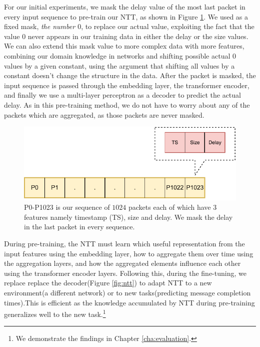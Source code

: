 For our initial experiments, we mask the delay value of the most last packet in every input sequence to pre-train our NTT, as shown in Figure \ref{fig:mask}. We used as a fixed mask, \emph{the number $0$}, to replace our actual value, exploiting the fact that the value $0$ never appears in our training data in either the delay or the size values. We can also extend this mask value to more complex data with more features, combining our domain knowledge in networks and shifting possible actual $0$ values by a given constant, using the argument that shifting all values by a constant doesn't change the structure in the data. After the packet is masked, the input sequence is passed through the embedding layer, the transformer encoder, and finally we use a multi-layer perceptron as a decoder to predict the actual delay. As in this pre-training method, we do not have to worry about any of the packets which are aggregated, as those packets are never masked.

\begin{figure}[h]
  \begin{center}
    \includegraphics[scale=1]{figures/mask.pdf}
    \caption{P0-P1023  is our sequence of $1024$ packets each of which have 3 features namely timestamp (TS), size and delay. We mask the delay in the last packet in every sequence. }
    \label{fig:mask}
  \end{center}
\end{figure}

During pre-training, the NTT must learn which useful representation from the input features using the embedding layer, how to aggregate them over time using the aggregation layers, and how the aggregated elements influence each other using the transformer encoder layers. Following this, during the fine-tuning, we replace replace the decoder(Figure \ref{fig:ntt}) to adapt NTT to a new environment(\eg a different network) or to new tasks(\eg predicting message completion times).This is efficient as the knowledge accumulated by NTT during pre-training generalizes well to the new task.\footnote{We demonstrate the findings in Chapter \ref{cha:evaluation}.}

